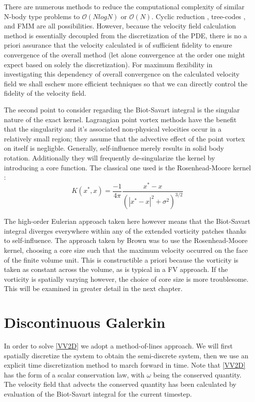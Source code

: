 \documentclass[letterpaper,12pt]{report}
\newcommand{\ben}[1]{\begin{equation}\label{#1}}
\newcommand{\ee}{\end{equation}}
\begin{document}
There are numerous methods to reduce the computational complexity of similar N-body type problems to $\mathcal{O}(NlogN)$ or $\mathcal{O}(N)$. Cyclic reduction \cite{SchumannSweet1976}, tree-codes \cite{LindsayKrasny2001,BarnesHut1986}, and FMM \cite{GreengardRokhlin1987} are all possibilities. However, because the velocity field calculation method is essentially decoupled from the discretization of the PDE, there is no a priori assurance that the velocity calculated is of sufficient fidelity to ensure convergence of the overall method (let alone convergence at the order one might expect based on solely the discretization). For maximum flexibility in investigating this dependency of overall convergence on the calculated velocity field we shall eschew more efficient techniques so that we can directly control the fidelity of the velocity field.

The second point to consider regarding the Biot-Savart integral is the singular nature of the exact kernel. Lagrangian point vortex methods have the benefit that the singularity and it's associated non-physical velocities occur in a relatively small region; they assume that the advective effect of the point vortex on itself is negligble. Generally, self-influence merely results in solid body rotation. Additionally they will frequently de-singularize the kernel by introducing a core function. The classical one used is the Rosenhead-Moore kernel \cite{Rosenhead1930,Moore1972}:
\ben{RMkern} K(x^*,x) = \frac{-1}{4 \pi} \frac{x^*-x}{(|x^*-x|^2+\sigma^2)^{3/2}} \ee

The high-order Eulerian approach taken here however means that the Biot-Savart integral diverges everywhere within any of the extended vorticity patches thanks to self-influence. The approach taken by Brown \cite{Brown2004} was to use the Rosenhead-Moore kernel, choosing a core size such that the maximum velocity occurred on the face of the finite volume unit. This is constructible a priori because the vorticity is taken as constant across the volume, as is typical in a FV approach. If the vorticity is spatially varying however, the choice of core size is more troublesome. This will be examined in greater detail in the next chapter.

\section{Discontinuous Galerkin}
In order to solve \eqref{VV2D} we adopt a method-of-lines approach. We will first spatially discretize the system to obtain the semi-discrete system, then we use an explicit time discretization method to march forward in time. Note that \eqref{VV2D} has the form of a scalar conservation law, with $\omega$ being the conserved quantity. The velocity field that advects the conserved quantity has been calculated by evaluation of the Biot-Savart integral for the current timestep.
\end{document}
